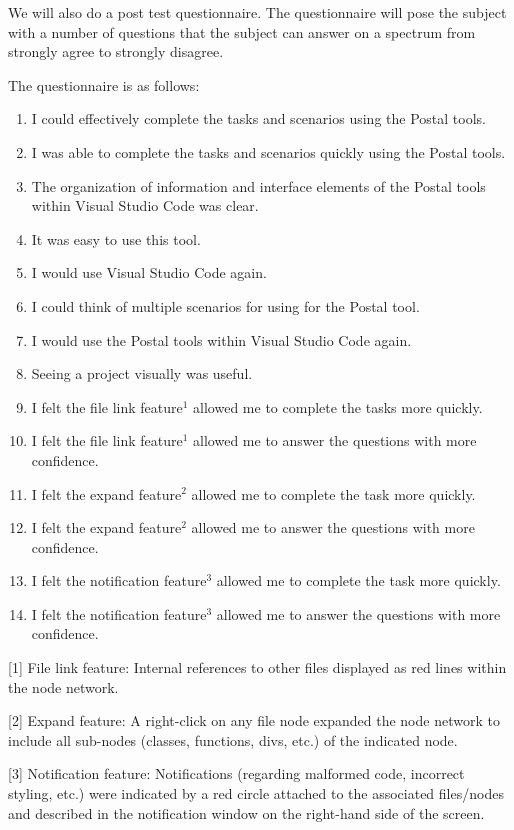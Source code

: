 \documentclass[letterpaper,10pt,titlepage,draftclsnofoot,onecolumn,onesided] {IEEEtran}
\begin{document}
	We will also do a post test questionnaire. 
	The questionnaire will pose the subject with a number of questions that the subject can answer on a spectrum from strongly agree to strongly disagree.

	The questionnaire is as follows: 
	
	\begin{enumerate}
		\item I could effectively complete the tasks and scenarios using the Postal tools.
		\item I was able to complete the tasks and scenarios quickly using the Postal tools.
		\item The organization of information and interface elements of the Postal tools within Visual Studio Code was clear.
		\item It was easy to use this tool.
		\item I would use Visual Studio Code again.
		\item I could think of multiple scenarios for using for the Postal tool. 
		\item I would use the Postal tools within Visual Studio Code again.
		\item Seeing a project visually was useful. 
		\item I felt the file link feature$^1$ allowed me to complete the tasks more quickly.
		\item I felt the file link feature$^1$ allowed me to answer the questions with more confidence.
		\item I felt the expand feature$^2$ allowed me to complete the task more quickly.
		\item I felt the expand feature$^2$ allowed me to answer the questions with more confidence.
		\item I felt the notification feature$^3$ allowed me to complete the task more quickly.
		\item I felt the notification feature$^3$ allowed me to answer the questions with more confidence.	
	\end{enumerate}

	[1] File link feature: Internal references to other files displayed as red lines within the node network.

	[2] Expand feature: A right-click on any file node expanded the node network to include all sub-nodes (classes, functions, divs, etc.) of the indicated node.

	[3] Notification feature: Notifications (regarding malformed code, incorrect styling, etc.) were indicated by a red circle attached to the associated files/nodes and described in the notification window on the right-hand side of the screen.
\end{document}
